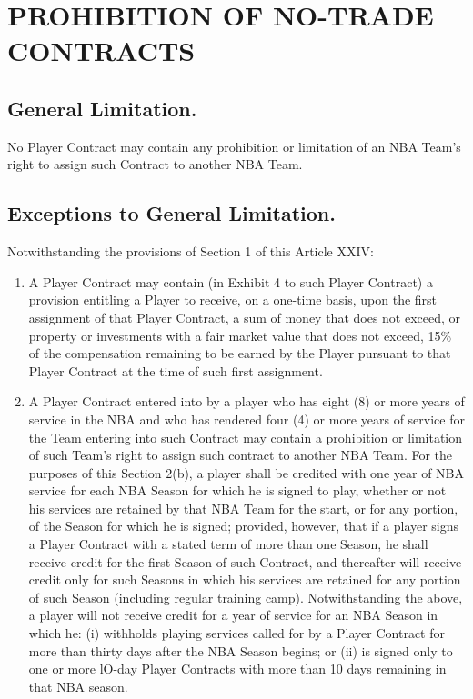 \documentclass[
]{book}
\providecommand{\tightlist}{%
  \setlength{\itemsep}{0pt}\setlength{\parskip}{0pt}}
\begin{document}
\hypertarget{prohibition-of-no-trade-contracts}{%
\chapter{PROHIBITION OF NO-TRADE CONTRACTS}\label{prohibition-of-no-trade-contracts}}

\hypertarget{general-limitation.}{%
\section{General Limitation.}\label{general-limitation.}}

No Player Contract may contain any prohibition or limitation of an NBA Team's right to assign such Contract to another NBA Team.

\hypertarget{exceptions-to-general-limitation.}{%
\section{Exceptions to General Limitation.}\label{exceptions-to-general-limitation.}}

Notwithstanding the provisions of Section 1 of this Article XXIV:

\begin{enumerate}
\def\labelenumi{(\alph{enumi})}
\tightlist
\item
  A Player Contract may contain (in Exhibit 4 to such Player Contract) a provision entitling a Player to receive, on a one-time basis, upon the first assignment of that Player Contract, a sum of money that does not exceed, or property or investments with a fair market value that does not exceed, 15\% of the compensation remaining to be earned by the Player pursuant to that Player Contract at the time of such first assignment.
\item
  A Player Contract entered into by a player who has eight (8) or more years of service in the NBA and who has rendered four (4) or more years of service for the Team entering into such Contract may contain a prohibition or limitation of such Team's right to assign such contract to another NBA Team. For the purposes of this Section 2(b), a player shall be credited with one year of NBA service for each NBA Season for which he is signed to play, whether or not his services are retained by that NBA Team for the start, or for any portion, of the Season for which he is signed; provided, however, that if a player signs a Player Contract with a stated term of more than one Season, he shall receive credit for the first Season of such Contract, and thereafter will receive credit only for such Seasons in which his services are retained for any portion of such Season (including regular training camp). Notwithstanding the above, a player will not receive credit for a year of service for an NBA Season in which he: (i) withholds playing services called for by a Player Contract for more than thirty days after the NBA Season begins; or (ii) is signed only to one or more lO-day Player Contracts with more than 10 days remaining in that NBA season.
\end{enumerate}
\end{document}

